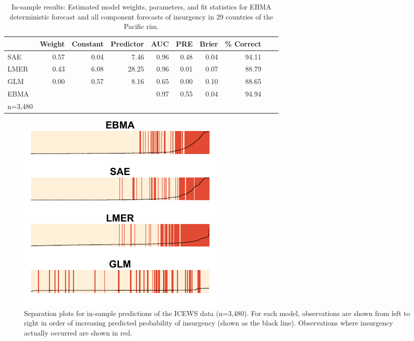 \documentclass[pdftex,12pt,fullpage,oneside]{amsart}
\begin{document}
\begin{table}[h!]
\small
\begin{center}
  \caption{\footnotesize In-sample results: Estimated model weights,
    parameters, and fit statistics for EBMA deterministic forecast and
    all component forecasts of insurgency in 29 countries of the
    Pacific rim.}\label{InSam1}
\begin{tabular}{l rrrrrrrrr}
  \toprule
 & Weight & Constant & Predictor & AUC & PRE & Brier & \% Correct \\ 
  \midrule
  SAE & 0.57 & 0.04 & 7.46 & 0.96 & 0.48 & 0.04 & 94.11\\ 
  LMER & 0.43 & 6.08 & 28.25 & 0.96 & 0.01 & 0.07 & 88.79\\ 
  GLM & 0.00 & 0.57 & 8.16 & 0.65 & 0.00 & 0.10 & 88.65\\ 
  EBMA &  &  &  & 0.97 & 0.55 & 0.04 & 94.94\\ 
   \bottomrule
n=3,480\\
\end{tabular}
\end{center}
\end{table}


\begin{figure}
\caption{\footnotesize Separation plots for in-sample predictions of the ICEWS data (n=3,480).  For each model,
  observations are shown from left to right in order of increasing
  predicted probability of insurgency (shown as the black line).  Observations where
insurgency actually occurred are shown in red.}
\label{InSam1sep}
\begin{center}
\includegraphics[]{Insamplenew.pdf}
\end{center}
\end{figure}
\end{document}
